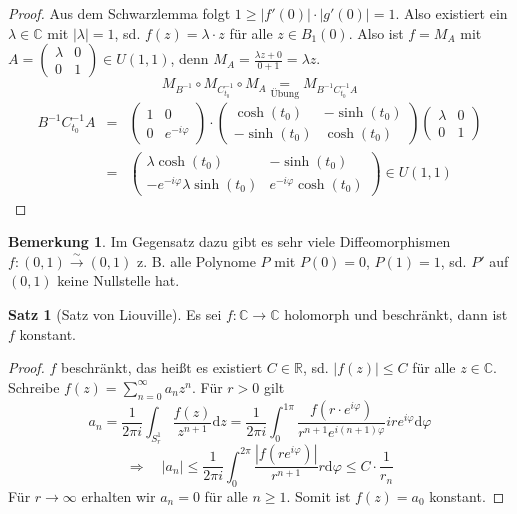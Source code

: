 \documentclass[11pt,titlepage]{article}
\theoremstyle{definition}
\newtheorem{theorem}{Satz}[section]
\newtheorem{remark}{Bemerkung}
\theoremstyle{remark}
\begin{document}
\begin{proof}
		Aus dem Schwarzlemma folgt $1\geq |f'(0)|\cdot |g'(0)|=1$. Also existiert ein $\lambda\in 
		\mathbb{C}$ mit $|\lambda|=1$, sd. $f(z)=\lambda \cdot z$ für alle $z\in B_1(0)$. 
		Also ist $f=M_A$ mit $A=\left( \begin{smallmatrix}\lambda&0\\0&1\end{smallmatrix}\right) 
		\in U(1,1)$, denn $M_A =\frac{\lambda z+0}{0+1}=\lambda z$.
		\[M_{B^{-1}}\circ M_{C_{t_0}^{-1}}\circ M_A \underset{\text{Übung}}{=} M_{B^{-1}C_{t_0}^{-1}A}\]
		\begin{eqnarray*}
			B^{-1}C_{t_0}^{-1} A &=& \begin{pmatrix}1&0\\0&e^{-i\varphi}\end{pmatrix}\cdot 
			\begin{pmatrix}\cosh(t_0)&-\sinh(t_0)\\-\sinh(t_0)&\cosh(t_0)\end{pmatrix}
			\begin{pmatrix}\lambda&0\\0&1\end{pmatrix}\\
			&=&\begin{pmatrix} \lambda \cosh(t_0)&-\sinh(t_0)\\-e^{-i\varphi}\lambda\sinh(t_0) &
			e^{-i\varphi}\cosh(t_0)\end{pmatrix}\in U(1,1)
		\end{eqnarray*}
	\end{proof}
	
	\begin{remark}
		Im Gegensatz dazu gibt es sehr viele Diffeomorphismen $f:(0,1)\overset{\sim}{\to}(0,1)$ 
		z. B. alle Polynome $P$ mit $P(0)=0$, $P(1)=1$, sd. $P'$ auf $(0,1)$ keine Nullstelle hat.
	\end{remark}
	
	\begin{theorem}[Satz von Liouville]
		Es sei $f:\mathbb{C}\to\mathbb{C}$ holomorph und beschränkt, dann ist $f$ konstant.
	\end{theorem}
	
	\begin{proof}
		$f$ beschränkt, das heißt es existiert $C\in\mathbb{R}$, sd. $|f(z)|\leq C$ für alle 
		$z\in\mathbb{C}$. Schreibe $f(z)=\sum_{n=0}^{\infty} a_n z^n$. Für $r>0$ gilt
		\[a_n=\frac{1}{2\pi i}\int_{S_r^1}\frac{f(z)}{z^{n+1}}\mathrm{d}z =
		\frac{1}{2\pi i}\int_0^{1\pi}\frac{f(r\cdot e^{i\varphi})}{r^{n+1}e^{i(n+1)\varphi}}ire^{i\varphi}
		\mathrm{d}\varphi \]
		\[ \Rightarrow\quad |a_n|\leq \frac{1}{2\pi i}\int_0^{2\pi}\frac{|f(re^{i\varphi})|}{r^{n+1}}r 
		\mathrm{d}\varphi\leq C\cdot \frac{1}{r_n} \]
		Für $r\to\infty$ erhalten wir $a_n =0$ für alle $n\geq 1$. Somit ist $f(z)=a_0$ konstant.
	\end{proof}
	
\end{document}
